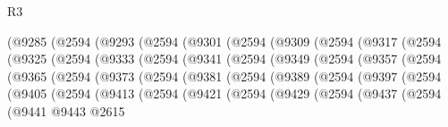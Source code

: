 \begin{lexlean}{R3}
\begin{coremodule}
            (@9285
              (@2594
                (@9293
                  (@2594
                    (@9301
                      (@2594
                        (@9309
                          (@2594
                            (@9317
                              (@2594
                                (@9325
                                  (@2594
                                    (@9333
                                      (@2594
                                        (@9341
                                          (@2594
                                            (@9349
                                              (@2594
                                                (@9357
                                                  (@2594
                                                    (@9365
                                                      (@2594
                                                        (@9373
                                                          (@2594
                                                            (@9381
                                                              (@2594
                                                                (@9389
                                                                  (@2594
                                                                    (@9397
                                                                      (@2594
                                                                        (@9405
                                                                          (@2594
                                                                            (@9413
                                                                              (@2594
                                                                                (@9421
                                                                                  (@2594
                                                                                    (@9429
                                                                                      (@2594
                                                                                        (@9437
                                                                                          (@2594
                                                                                            (@9441
                                                                                              @9443
                                                                                              @2615

\end{coremodule}
\end{lexlean}
